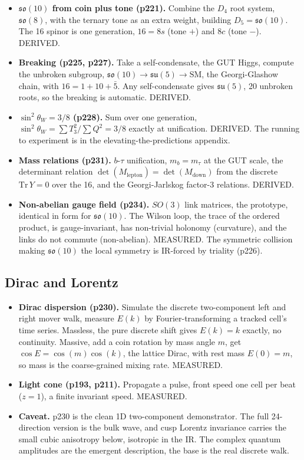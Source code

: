 \begin{itemize}
  \item \textbf{$\mathfrak{so}(10)$ from coin plus tone (p221).} Combine the $D_4$ root system,
  $\mathfrak{so}(8)$, with the ternary tone as an extra weight, building $D_5 = \mathfrak{so}(10)$. The 16 spinor
  is one generation, $16 = 8s$ (tone $+$) and $8c$ (tone $-$). DERIVED.
  \item \textbf{Breaking (p225, p227).} Take a self-condensate, the GUT Higgs, compute the unbroken subgroup,
  $\mathfrak{so}(10) \to \mathfrak{su}(5) \to \mathrm{SM}$, the Georgi-Glashow chain, with
  $16 = 1 + 10 + \bar{5}$. Any self-condensate gives $\mathfrak{su}(5)$, 20 unbroken roots, so the breaking is
  automatic. DERIVED.
  \item \textbf{$\sin^2\theta_W = 3/8$ (p228).} Sum over one generation,
  $\sin^2\theta_W = \sum T_3^2 / \sum Q^2 = 3/8$ exactly at unification. DERIVED. The running to experiment is in
  the elevating-the-predictions appendix.
  \item \textbf{Mass relations (p231).} $b$-$\tau$ unification, $m_b = m_\tau$ at the GUT scale, the determinant
  relation $\det(M_{\mathrm{lepton}}) = \det(M_{\mathrm{down}})$ from the discrete $\mathrm{Tr}\,Y = 0$ over the
  16, and the Georgi-Jarlskog factor-3 relations. DERIVED.
  \item \textbf{Non-abelian gauge field (p234).} $SO(3)$ link matrices, the prototype, identical in form for
  $\mathfrak{so}(10)$. The Wilson loop, the trace of the ordered product, is gauge-invariant, has non-trivial
  holonomy (curvature), and the links do not commute (non-abelian). MEASURED. The symmetric collision making
  $\mathfrak{so}(10)$ the local symmetry is IR-forced by triality (p226).
\end{itemize}

\subsection{Dirac and Lorentz}

\begin{itemize}
  \item \textbf{Dirac dispersion (p230).} Simulate the discrete two-component left and right mover walk, measure
  $E(k)$ by Fourier-transforming a tracked cell's time series. Massless, the pure discrete shift gives $E(k) = k$
  exactly, no continuity. Massive, add a coin rotation by mass angle $m$, get $\cos E = \cos(m)\cos(k)$, the
  lattice Dirac, with rest mass $E(0) = m$, so mass is the coarse-grained mixing rate. MEASURED.
  \item \textbf{Light cone (p193, p211).} Propagate a pulse, front speed one cell per beat ($z = 1$), a finite
  invariant speed. MEASURED.
  \item \textbf{Caveat.} p230 is the clean 1D two-component demonstrator. The full 24-direction version is the bulk
  wave, and cusp Lorentz invariance carries the small cubic anisotropy below, isotropic in the IR. The complex
  quantum amplitudes are the emergent description, the base is the real discrete walk.
\end{itemize}

